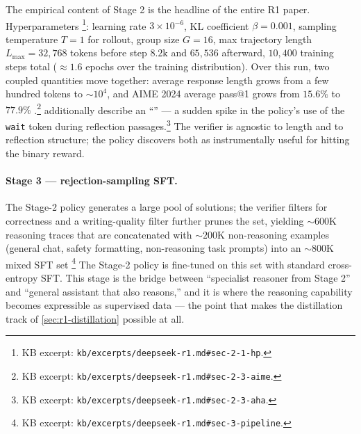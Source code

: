 The empirical content of Stage 2 is the headline of the entire R1
paper. Hyperparameters \citep[\S
2.1]{deepseek-r1}\footnote{KB excerpt:
\texttt{kb/excerpts/deepseek-r1.md\#sec-2-1-hp}.}: learning rate
$3\!\times\!10^{-6}$, KL coefficient $\beta = 0.001$, sampling
temperature $T = 1$ for rollout, group size $G = 16$, max trajectory
length $L_\text{max} = 32{,}768$ tokens before step $8.2\text{k}$ and
$65{,}536$ afterward, $10{,}400$ training steps total ($\approx 1.6$
epochs over the training distribution). Over this run, two coupled
quantities move together: average response length grows from a few
hundred tokens to $\sim\!10^4$, and AIME 2024 average pass@1 grows
from $15.6\%$ to $77.9\%$ \citep[\S
2.3]{deepseek-r1}.\footnote{KB excerpt:
\texttt{kb/excerpts/deepseek-r1.md\#sec-2-3-aime}.} \citet[\S
2.3]{deepseek-r1} additionally describe an
``'' --- a sudden spike in the policy's use of the
\texttt{wait} token during reflection passages.\footnote{KB excerpt:
\texttt{kb/excerpts/deepseek-r1.md\#sec-2-3-aha}.} The verifier is
agnostic to length and to reflection structure; the policy discovers
both as instrumentally useful for hitting the binary reward.

\paragraph{Stage 3 --- rejection-sampling SFT.} The Stage-2 
policy generates a large pool of solutions; the verifier filters for
correctness and a writing-quality filter further prunes the set,
yielding $\sim\!600$K reasoning traces that are concatenated with
$\sim\!200$K non-reasoning examples (general chat, safety formatting,
non-reasoning task prompts) into an $\sim\!800$K mixed
SFT set \citep[\S 3]{deepseek-r1}\footnote{KB excerpt:
\texttt{kb/excerpts/deepseek-r1.md\#sec-3-pipeline}.} The Stage-2
policy is fine-tuned on this set with standard cross-entropy SFT.
This stage is the bridge between ``specialist reasoner from Stage 2''
and ``general assistant that also reasons,'' and it is where the
reasoning capability becomes expressible as supervised data --- the
point that makes the distillation track of \cref{sec:r1-distillation}
possible at all.

